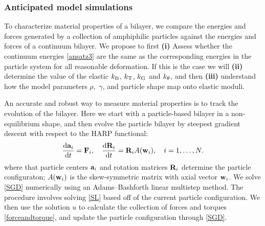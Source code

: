 
\subsubsection{Anticipated model simulations}
To characterize material properties of a bilayer, we compare the energies and forces generated by
a collection of amphiphilic particles against the energies and forces of a continuum bilayer.
We propose to first {\bf (i)} Assess whether the continuum energies \eqref{ansatz3} are the same
as the corresponding energies in the particle system for all reasonable deformation.
If this is the case we will {\bf (ii)} determine the value of the elastic $k_{\mathrm{B}}$,
$k_{\mathrm{T}}$, $k_{\mathrm{G}}$ and $k_{\theta}$, and then {\bf (iii)} understand how the model parameters $\rho,$ $\gamma$, and particle shape map onto elastic moduli. 
%

An accurate and robust way to measure material properties is to track the evolution of the bilayer. 
Here we start with a particle-based bilayer in a non-equilibrium shape, and then evolve the particle bilayer by steepest gradient descent with respect to the
HARP functional:
\begin{equation}
\label{SGD}   
\frac{\dif {\bf a}_i}{\dif t} = {\bf F}_i,    \quad  \frac{\dif {\bf R}_i}{\dif t}  = {\bf R}_i A({\bf w}_i),\quad i = 1, \dots, N.
\end{equation}
where that particle centers ${\bf a}_i$ and rotation matrices ${\bf R}_i$ determine the particle configuraton; 
$A({\bf w}_i)$ is the skew-symmetric matrix with axial vector ${\bf w}_i$.
We solve \eqref{SGD} numerically 
using an Adams–Bashforth linear multistep method. The procedure involves solving \eqref{SL} based off of the current particle configuration.
We then use the solution $u$ to calculate the collection of forces and torques \eqref{forceandtorque}, and update the particle configuration
through \eqref{SGD}.

